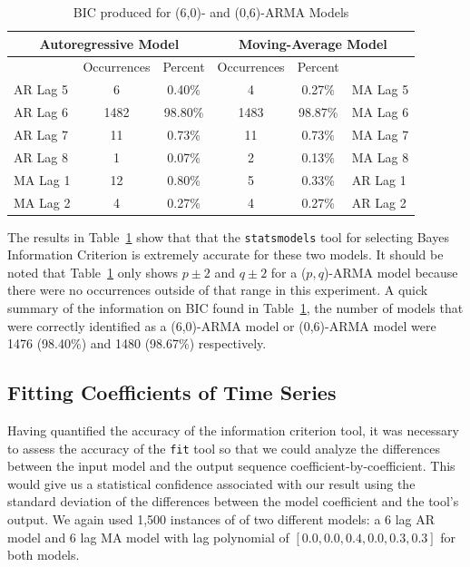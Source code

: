 \documentclass[oneside,12pt,openany]{book}
\begin{document}
    \begin{table}[hbt!]
        \centering
        \begin{tabular}{|l|c|c|c|c|l|}
            \hline
            \multicolumn{3}{|c|}{Autoregressive Model} & \multicolumn{3}{c|}{Moving-Average Model} \\ \hline
            \cellcolor{black} & Occurrences & Percent & Occurrences & Percent & \cellcolor{black} \\ \hline
            AR Lag 5 & 6 & 0.40\% & 4 & 0.27\% & MA Lag 5 \\ \hline
            AR Lag 6 & 1482 & 98.80\% & 1483 & 98.87\% & MA Lag 6 \\ \hline
            AR Lag 7 & 11 & 0.73\% & 11 & 0.73\% & MA Lag 7 \\ \hline
            AR Lag 8 & 1 & 0.07\% & 2 & 0.13\% & MA Lag 8 \\ \hline
            MA Lag 1 & 12 & 0.80\% & 5 & 0.33\% & AR Lag 1 \\ \hline
            MA Lag 2 & 4 & 0.27\% & 4 & 0.27\% & AR Lag 2 \\ \hline
        \end{tabular}
        \caption{BIC produced for (6,0)- and (0,6)-ARMA Models}
        \label{tab:bic6}
    \end{table}
    
    
    The results in Table~\ref{tab:bic6} show that that the \texttt{statsmodels} tool for selecting Bayes Information Criterion is extremely accurate for these two models. It should be noted that Table~\ref{tab:bic6} only shows $p\pm2$ and $q\pm2$ for a ($p,q$)-ARMA model because there were no occurrences outside of that range in this experiment. A quick summary of the information on BIC found in Table~\ref{tab:bic6}, the number of models that were correctly identified as a (6,0)-ARMA model or (0,6)-ARMA model were 1476 (98.40\%) and 1480 (98.67\%) respectively.
    
    \subsection{Fitting Coefficients of Time Series}
    
    Having quantified the accuracy of the information criterion tool, it was necessary to assess the accuracy of the \texttt{fit} tool so that we could analyze the differences between the input model and the output sequence coefficient-by-coefficient. This would give us a statistical confidence associated with our result using the standard deviation of the differences between the model coefficient and the tool's output. We again used 1,500 instances of of two different models: a 6 lag AR model and 6 lag MA model with lag polynomial of $[0.0,0.0,0.4,0.0,0.3,0.3]$ for both models.
    
\end{document}
